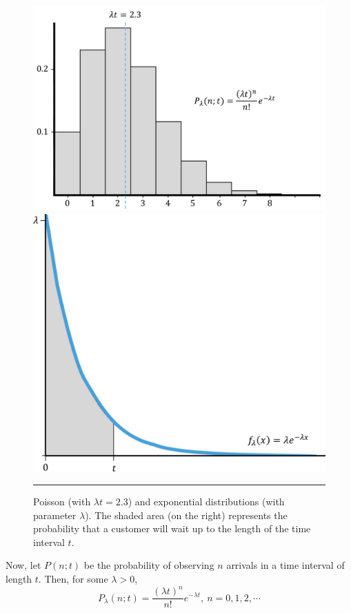 \begin{figure}[!t]
\centering
\includegraphics[height=0.25\textheight]{Images/poisson.png}
\centering\includegraphics[height=0.25\textheight]{Images/exp.png}
\caption{\small Poisson (with $\lambda t=2.3$) and exponential distributions (with parameter $\lambda$). The shaded area (on the right) represents the probability that a customer will wait up to the length of the time interval $t$.}\label{fig:dist1}\hrule
\end{figure}
Now, let $P(n;t)$ be the probability of observing $n$ arrivals in a time interval of length $t$.
Then, for some $\lambda>0$, 
$$ P_{\lambda}(n; t) = \frac{(\lambda t)^n}{n!} e^{-\lambda t}, \ n=0,1,2,\cdots$$
